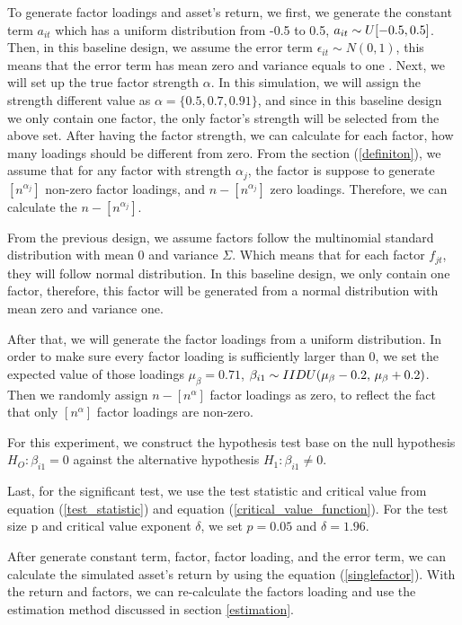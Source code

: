 \documentclass[12pt]{article}
\begin{document}
To generate factor loadings and asset's return, we first, we generate the constant term $a_{it}$ which has a uniform distribution from -0.5 to 0.5, $a_{it} \sim \mathnormal{U}[-0.5,0.5]$.
Then, in this baseline design, we assume the error term $\epsilon_{it}\sim N(0,1)$, this means that the error term has mean zero and variance equals to one .
Next, we will set up the true factor strength $\alpha$.
In this simulation, we will assign the strength different value as $\alpha = \{0.5, 0.7, 0.9 1\}$, and since in this baseline design we only contain one factor, the only factor's strength will be selected from the above set. 
After having the factor strength, we can calculate for each factor, how many loadings should be different from zero.
From the section (\ref{definiton}), we assume that for any factor with strength $\alpha_j$, the factor is suppose to generate $[n^{\alpha_j}]$ non-zero factor loadings, and $n- [n^{\alpha_j}]$ zero loadings.
Therefore, we can calculate the $n - [n^{\alpha_j}]$.

From the previous design, we assume factors follow the multinomial standard distribution with mean 0 and variance $\Sigma$.
Which means that for each factor $f_{jt}$, they will follow normal distribution.
In this baseline design, we only contain one factor, therefore, this factor will be generated from a normal distribution with mean zero and variance one.

After that, we will generate the factor loadings from a uniform distribution.
In order to make sure every factor loading is sufficiently larger than 0, we set the expected value of those loadings  $\mu_{\beta} = 0.71$, $\beta_{i1} \sim \mathnormal{IIDU}(\mu_{\beta}-0.2,\, \mu_{\beta}+0.2)$.
Then we randomly assign $n - [n^\alpha]$ factor loadings as zero, to reflect the fact that only $[n^\alpha]$ factor loadings are non-zero.


For this experiment, we construct the hypothesis test base on the null hypothesis $H_O: \beta_{i1} = 0$ against the alternative hypothesis $H_1: \beta_{i1}\neq0$.


Last, for the significant test, we use the test statistic and critical value from equation (\ref{test_statistic}) and equation (\ref{critical_value_function}).
For the test size p and critical value exponent $\delta$, we set $p = 0.05$ and $\delta = 1.96$.


After generate constant term, factor, factor loading, and the error term, we can calculate the simulated asset's return by using the equation (\ref{singlefactor}).
With the return and factors, we can re-calculate the factors loading and use the estimation method discussed in section \ref{estimation}.
\end{document}
